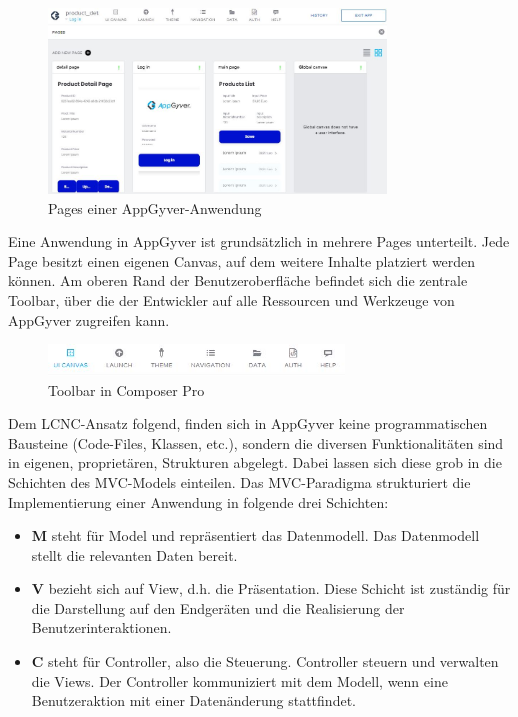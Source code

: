 \begin{figure}[htbp]
 \centering
 \includegraphics[width=0.8\textwidth]{Bilder/appgyver/2_2_Pages_in_AppGyver.jpg}
 \caption{Pages einer AppGyver-Anwendung}
\end{figure}

Eine Anwendung in AppGyver ist grundsätzlich in mehrere Pages unterteilt. Jede Page besitzt einen eigenen Canvas, auf dem weitere Inhalte platziert werden können. Am oberen Rand der Benutzeroberfläche befindet sich die zentrale Toolbar, über die der Entwickler auf alle Ressourcen und Werkzeuge von AppGyver zugreifen kann. 

\begin{figure}[htbp]
 \centering
 \includegraphics[width=0.7\textwidth]{Bilder/appgyver/2_3_AppGyver Toolbar.JPG}
 \caption{Toolbar in Composer Pro}
\end{figure}

Dem LCNC-Ansatz folgend, finden sich in AppGyver keine programmatischen Bausteine (Code-Files, Klassen, etc.), sondern die diversen Funktionalitäten sind in eigenen, proprietären, Strukturen abgelegt. Dabei lassen sich diese grob in die Schichten des MVC-Models einteilen. Das MVC-Paradigma strukturiert die Implementierung einer Anwendung in folgende drei Schichten: 
\begin{itemize}[noitemsep]
\item \textbf{M} steht für Model und repräsentiert das Datenmodell. Das Datenmodell stellt die relevanten Daten bereit.
\item \textbf{V} bezieht sich auf View, d.h. die Präsentation. Diese Schicht ist zuständig für die Darstellung auf den Endgeräten und die Realisierung der Benutzerinteraktionen.
\item \textbf{C} steht für Controller, also die Steuerung. Controller steuern und verwalten die Views. Der Controller kommuniziert mit dem Modell, wenn eine Benutzeraktion mit einer Datenänderung stattfindet.
\end{itemize}

